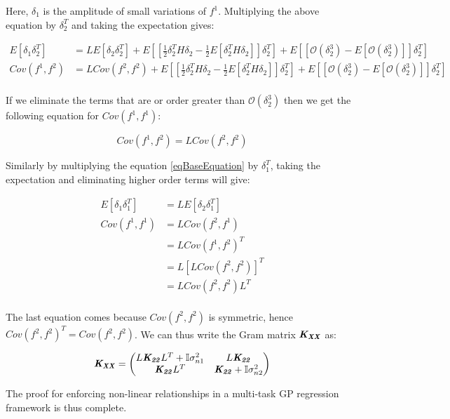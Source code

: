 Here, \(\delta_1\) is the amplitude of small variations of \(f^{1}\). Multiplying the above equation by $\delta_2^T$ and taking the expectation gives:

\begin{equation}
\begin{aligned}
    E[\delta_1 \delta_2^T] & = L E[\delta_2 \delta_2^T] + E\left [\left [\frac{1}{2} \delta_2^T H \delta_2 - \frac{1}{2} E[\delta_2^T H \delta_2]\right ] \delta_2^T\right ] + E \left [ \left [ \mathcal{O}(\delta_2^3)   - E[\mathcal{O}(\delta_2^3)]\right ] \delta_2^T\right ] \\
    Cov(f^1, f^2) & = L Cov(f^2, f^2) + E\left [\left [\frac{1}{2} \delta_2^T H \delta_2 - \frac{1}{2} E[\delta_2^T H \delta_2]\right ] \delta_2^T\right ] + E \left [ \left [ \mathcal{O}(\delta_2^3)   - E[\mathcal{O}(\delta_2^3)]\right ] \delta_2^T\right ] \\
\end{aligned}
\end{equation}

If we eliminate the terms that are or order greater than $\mathcal{O}(\delta_2^3)$ then we get the following equation for $Cov(f^1, f^1)$:

\begin{equation}
    Cov(f^1, f^2) = L Cov(f^2, f^2)
\end{equation}

Similarly by multiplying the equation \ref{eqBaseEquation} by $\delta_1^T$, taking the expectation and eliminating higher order terms will give:

\begin{equation}
\begin{aligned}
    E[\delta_1 \delta_1^T] & = L E[\delta_2 \delta_1^T] \\
    Cov(f^1, f^1)   & = L Cov(f^2, f^1) \\
                    & = L Cov(f^1, f^2)^T \\
                    & = L [L Cov(f^2, f^2)]^T \\
                    & = L Cov(f^2, f^2) L^T \\
\end{aligned}
\end{equation}

The last equation comes because $Cov(f^2, f^2)$ is symmetric, hence $Cov(f^2, f^2)^T = Cov(f^2, f^2)$. We can thus write the Gram matrix $\bm{\mathit{K_{XX}}}$ as:

\begin{equation}
    \bm{\mathit{K_{XX}}} = \begin{pmatrix}
    L \bm{\mathit{K_{22}}} L^T + \mathbb{I}\sigma_{n1}^2 & L\bm{\mathit{K_{22}}}\\ 
    \bm{\mathit{K_{22}}} L^T     & \bm{\mathit{K_{22}}} + \mathbb{I}\sigma_{n2}^2
   \end{pmatrix}
\end{equation}

The proof for enforcing non-linear relationships in a multi-task GP regression framework is thus complete. 











